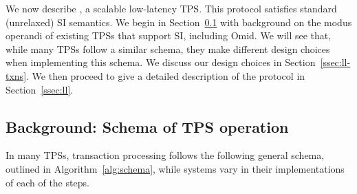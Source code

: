 

We now describe \sysll, a scalable low-latency TPS.
This protocol satisfies standard (unrelaxed) SI semantics.
We begin in Section~\ref{ssec:schema} with  background on the modus operandi of existing TPSs that support SI, including Omid. 
We will see that, while many TPSs follow a similar schema,  they make different design choices when implementing this schema. 
We discuss our design choices in Section~\ref{ssec:ll-txns}. 
We then proceed to give a detailed description of the protocol
in Section~\ref{ssec:ll}.

\subsection{Background: Schema of TPS operation}
\label{ssec:schema}


In many TPSs, transaction processing follows the following general schema, outlined in Algorithm~\ref{alg:schema}, 
while systems vary in their implementations of each of the steps.


